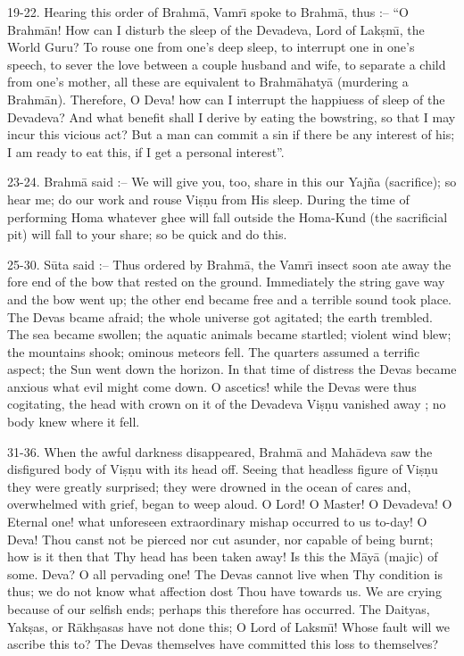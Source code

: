 19-22. Hearing this order of Brahm\=a, Vamr\={\i} spoke to Brahm\=a, thus :-- ``O Brahm\=an! How can I disturb the sleep of the Devadeva, Lord of Lak\d{s}m\={\i}, the World Guru? To rouse one from one's deep sleep, to interrupt one in one's speech, to sever the love between a couple husband and wife, to separate a child from one's mother, all these are equivalent to Brahm\=ahaty\=a (murdering a Brahm\=an). Therefore, O Deva! how can I interrupt the happiuess of sleep of the Devadeva? And what benefit shall I derive by eating the bowstring, so that I may incur this vicious act? But a man can commit a sin if there be any interest of his; I am ready to eat this, if I get a personal interest''.

23-24. Brahm\=a said :-- We will give you, too, share in this our Yaj\~na (sacrifice); so hear me; do our work and rouse Vi\d{s}\d{n}u from His sleep. During the time of performing Homa whatever ghee will fall outside the Homa-Kund (the sacrificial pit) will fall to your share; so be quick and do this.

25-30. S\=uta said :-- Thus ordered by Brahm\=a, the Vamr\={\i} insect soon ate away the fore end of the bow that rested on the ground. Immediately the string gave way and the bow went up; the other end became free and a terrible sound took place. The Devas bcame afraid; the whole universe got agitated; the earth trembled. The sea became swollen; the aquatic animals became startled; violent wind blew; the mountains shook; ominous meteors fell. The quarters assumed a terrific aspect; the Sun went down the horizon. In that time of distress the Devas became anxious what evil might come down. O ascetics! while the Devas were thus cogitating, the head with crown on it of the Devadeva Vi\d{s}\d{n}u vanished away ; no body knew where it fell.

31-36. When the awful darkness disappeared, Brahm\=a and Mah\=adeva saw the disfigured body of Vi\d{s}\d{n}u with its head off. Seeing that headless figure of Vi\d{s}\d{n}u they were greatly surprised; they were drowned in the ocean of cares and, overwhelmed with grief, began to weep aloud. O Lord! O Master! O Devadeva! O Eternal one! what unforeseen extraordinary mishap occurred to us to-day! O Deva! Thou canst not be pierced nor cut asunder, nor capable of being burnt; how is it then that Thy head has been taken away! Is this the M\=ay\=a (majic) of some. Deva? O all pervading one! The Devas cannot live when Thy condition is thus; we do not know what affection dost Thou have towards us. We are crying because of our selfish ends; perhaps this therefore has occurred. The Daityas, Yak\d{s}as, or R\=akh\d{s}asas have not done this; O Lord of Laksm\={\i}! Whose fault will we ascribe this to? The Devas themselves have committed this loss to themselves?

